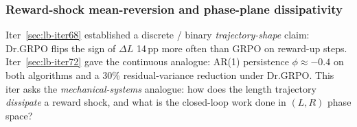 
\subsubsection{Reward-shock mean-reversion and phase-plane dissipativity}\label{sec:lb-iter76}

Iter~\ref{sec:lb-iter68} established a discrete / binary
\emph{trajectory-shape} claim: Dr.GRPO flips the sign of $\Delta L$
14\,pp more often than GRPO on reward-up steps. Iter~\ref{sec:lb-iter72}
gave the continuous analogue: AR(1) persistence $\phi \approx -0.4$ on
both algorithms and a 30\% residual-variance reduction under
Dr.GRPO. This iter asks the \emph{mechanical-systems} analogue: how
does the length trajectory \emph{dissipate} a reward shock, and what is
the closed-loop work done in $(L, R)$ phase space?

